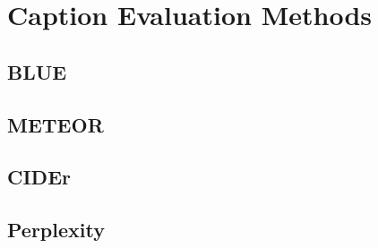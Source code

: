 \chapter{Caption Evaluation Methods}

\section{BLUE}

\section{METEOR}

\section{CIDEr}

\section{Perplexity}